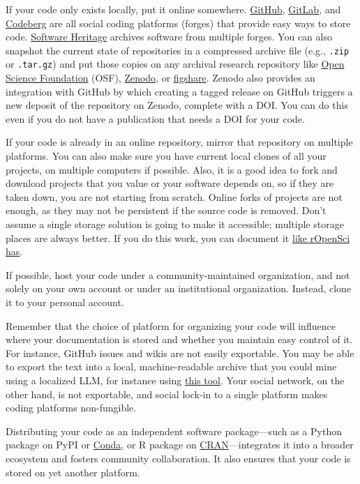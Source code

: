 \documentclass[10pt,letterpaper]{article}
\begin{document}
If your code only exists locally,
put it online somewhere.
\href{https://github.com/}{GitHub},
\href{https://gitlab.com}{GitLab},
and \href{https://codeberg.org/}{Codeberg} are all social coding platforms (forges)
that provide easy ways to store code.
\href{https://www.softwareheritage.org/how-to-archive-reference-code/}{Software Heritage}
archives software from multiple forges.
You can also snapshot the current state of repositories in a compressed archive file
(e.g., \texttt{.zip} or \texttt{.tar.gz})
and put those copies on any archival research repository like \href{https://osf.io/}{Open Science Foundation} (OSF),
\href{https://zenodo.org/}{Zenodo},
or \href{https://figshare.com/}{figshare}.
Zenodo also provides an integration with GitHub
by which creating a tagged release on GitHub triggers a new deposit of the repository on Zenodo,
complete with a DOI.
You can do this even if you do not have a publication that needs a DOI for your code.

If your code is already in an online repository,
mirror that repository on multiple platforms.
You can also make sure you have current local clones of all your projects,
on multiple computers if possible.
Also,
it is a good idea to fork and download projects that you value or your software depends on,
so if they are taken down,
you are not starting from scratch.
Online forks of projects are not enough,
as they may not be persistent if the source code is removed.
Don't assume a single storage solution is going to make it accessible;
multiple storage places are always better.
If you do this work,
you can document it
\href{https://ropensci.org/blog/2022/03/22/safeguards-and-backups-for-github-organizations/}{like rOpenSci has}.

If possible,
host your code under a community-maintained organization,
and not solely on your own account or under an institutional organization.
Instead, clone it to your personal account.

Remember that the choice of platform for organizing your code
will influence where your documentation is stored and whether you maintain easy control of it.
For instance,
GitHub issues and wikis are not easily exportable.
You may be able to export the text into a local, machine-readable archive
that you could mine using a localized LLM,
for instance using \href{https://github.com/jlord/offline-issues}{this tool}.
Your social network,
on the other hand,
is not exportable,
and social lock-in to a single platform makes coding platforms non-fungible.

Distributing your code as an independent software package---such as a Python package on PyPI
or \href{https://anaconda.org/anaconda/conda}{Conda},
or R package on \href{https://cran.r-project.org/}{CRAN}---integrates it into
a broader ecosystem and fosters community collaboration.
It also ensures that your code is stored on yet another platform.
\end{document}
